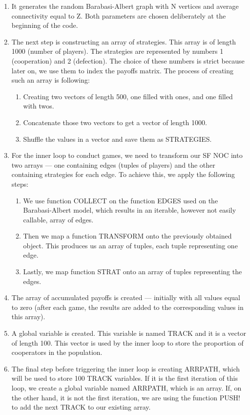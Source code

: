 \documentclass[english, twoside, 12pt, a4paper]{article}
\theoremstyle{definition}
\theoremstyle{plain}
\theoremstyle{remark}
\begin{document}
\begin{enumerate}
  \item It generates the random Barabasi-Albert graph with N vertices and average connectivity equal to Z. Both parameters are chosen deliberately at the beginning of the code.
  \item The next step is constructing an array of strategies. This array is of length 1000 (number of players). The strategies are represented by numbers 1 (cooperation) and 2 (defection). The choice of these numbers is strict because later on, we use them to index the payoffs matrix.
        The process of creating such an array is following:
        \begin{enumerate}
          \item Creating two vectors of length 500, one filled with ones, and one filled with twos.
          \item Concatenate those two vectors to get a vector of length 1000.
          \item Shuffle the values in a vector and save them as STRATEGIES.
        \end{enumerate}
  \item For the inner loop to conduct games, we need to transform our SF NOC into two arrays --- one containing edges (tuples of players) and the other containing strategies for each edge. To achieve this, we apply the following steps:
        \begin{enumerate}
          \item We use function COLLECT on the function EDGES used on the Barabasi-Albert model, which results in an iterable, however not easily callable, array of edges.  
          \item Then we map a function TRANSFORM onto the previously obtained object. This produces us an array of tuples, each tuple representing one edge.
          \item Lastly, we map function STRAT onto an array of tuples representing the edges.
        \end{enumerate}
  \item The array of accumulated payoffs is created --- initially with all values equal to zero (after each game, the results are added to the corresponding values in this array).
  \item A global variable is created. This variable is named TRACK and it is a vector of length 100. This vector is used by the inner loop to store the proportion of cooperators in the population.
  \item The final step before triggering the inner loop is creating ARRPATH, which will be used to store 100 TRACK variables. If it is the first iteration of this loop, we create a global variable named ARRPATH, which is an array. If, on the other hand, it is not the first iteration, we are using the function PUSH! to 
        add the next TRACK to our existing array. 
\end{enumerate}
\end{document}
